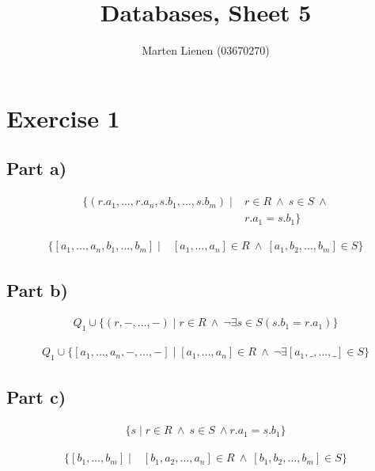\documentclass[10pt,a4paper]{article}
\title{Databases, Sheet 5}
\author{Marten Lienen (03670270)}
\begin{document}
\maketitle

\section*{Exercise 1}

\subsection*{Part a)}

\begin{align*}
  \{ (r.a_{1}, \dots, r.a_{n}, s.b_{1}, \dots, s.b_{m}) \mid & r \in R\ \land\ s \in S\ \land\\
                                                             & r.a_{1} = s.b_{1} \}
\end{align*}

\begin{align*}
  \{ [a_{1}, \dots, a_{n}, b_{1}, \dots, b_{m}] \mid & [a_{1}, \dots, a_{n}] \in R\ \land\ [a_{1}, b_{2}, \dots, b_{m}] \in S \}
\end{align*}

\subsection*{Part b)}

\begin{align*}
  Q_{1} \cup \{ (r, -, \dots, -) \mid r \in R\ \land\ \lnot \exists s \in S (s.b_{1} = r.a_{1}) \}
\end{align*}

\begin{align*}
  Q_{1} \cup \{ [a_{1}, \dots, a_{n}, -, \dots, -] \mid [a_{1}, \dots, a_{n}] \in R\ \land\ \lnot \exists [a_{1}, \_, \dots, \_] \in S \}
\end{align*}

\subsection*{Part c)}

\begin{align*}
  \{ s \mid r \in R\ \land\ s \in S\ \land r.a_{1} = s.b_{1} \}
\end{align*}

\begin{align*}
  \{ [b_{1}, \dots, b_{m}] \mid & [b_{1}, a_{2}, \dots, a_{n}] \in R\ \land\ [b_{1}, b_{2}, \dots, b_{m}] \in S \}
\end{align*}
\end{document}
